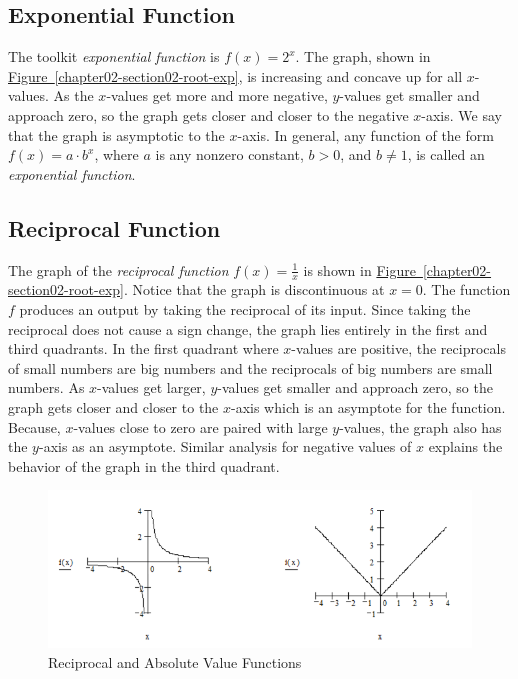 \documentclass[10pt,]{book}
\theoremstyle{ptxdefinitionnotitle}
\theoremstyle{ptxdefinitiontitle}
\numberwithin{equation}{section}
\newcommand{\gt}{>}
\begin{document}
\subsection[{Exponential Function}]{Exponential Function}\label{subsection-7}
\hypertarget{p-49}{}%
The toolkit \emph{exponential function} is \(f(x) = 2^x\).  The graph, shown in \hyperref[chapter02-section02-root-exp]{Figure~\ref{chapter02-section02-root-exp}}, is increasing and concave up for all \(x\)-values.  As the \(x\)-values get more and more negative, \(y\)-values get smaller and approach zero, so the graph gets closer and closer to the negative \(x\)-axis.  We say that the graph is asymptotic to the \(x\)-axis.  In general, any function of the form \(f(x) = a \cdot b^x\), where \(a\) is any nonzero constant, \(b \gt 0\), and \(b \neq 1\), is called an \emph{exponential function}.%
\typeout{************************************************}
\typeout{************************************************}
\subsection[{Reciprocal Function}]{Reciprocal Function}\label{subsection-8}
\hypertarget{p-50}{}%
The graph of the \emph{reciprocal function} \(f(x) = \frac{1}{x}\) is shown in \hyperref[chapter02-section02-root-exp]{Figure~\ref{chapter02-section02-root-exp}}.  Notice that the graph is discontinuous at \(x = 0\). The function \(f\) produces an output by taking the reciprocal of its input.  Since taking the reciprocal does not cause a sign change, the graph lies entirely in the first and third quadrants.  In the first quadrant where \(x\)-values are positive, the reciprocals of small numbers are big numbers and the reciprocals of big numbers are small numbers. As \(x\)-values get larger, \(y\)-values get smaller and approach zero, so the graph gets closer and closer to the \(x\)-axis which is an asymptote for the function.  Because, \(x\)-values close to zero are paired with large \(y\)-values, the graph also has the \(y\)-axis as an asymptote.  Similar analysis for negative values of \(x\) explains the behavior of the graph in the third quadrant.%
\begin{figure}
\centering
\includegraphics[width=1\linewidth]{./src/images/chapter02/chapter02section02-reciprocal.png}
\caption{Reciprocal and Absolute Value Functions\label{chapter02-section02-recip-abs}}
\end{figure}
\typeout{************************************************}
\typeout{************************************************}
\end{document}
